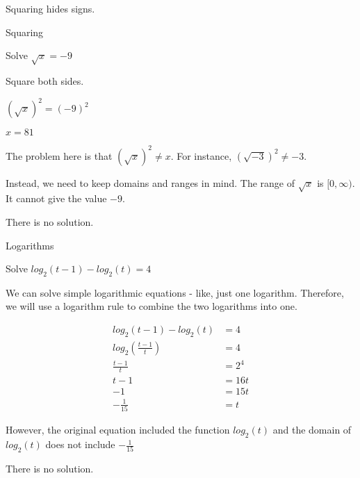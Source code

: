 \documentclass{ximera}
\begin{document}
Squaring hides signs.


\begin{example} Squaring


Solve $\sqrt{x} = -9$

\begin{explanation}

Square both sides.


$(\sqrt{x})^2 = (-9)^2$

$x = 81$



The problem here is that  $(\sqrt{x})^2 \ne x$.  For instance, $(\sqrt{-3})^2 \ne -3$.


Instead, we need to keep domains and ranges in mind.  The range of $\sqrt{x}$ is $[0, \infty)$. It cannot give the value $-9$.


There is no solution.


\end{explanation}

\end{example}









\begin{example} Logarithms


Solve $log_2(t-1) - log_2(t) = 4$


\begin{explanation}


We can solve simple logarithmic equations - like, just one logarithm.  Therefore, we will use a logarithm rule to combine the two logarithms into one.




\begin{align*}
log_2(t-1) - log_2(t) & = 4   \\
log_2 \left( \frac{t-1}{t} \right)  & = 4  \\
\frac{t-1}{t} & = 2^4  \\
 t-1 & = 16t  \\
-1 & = 15t  \\
-\frac{1}{15} & = t
\end{align*}



However, the original equation included the function $log_2(t)$ and the domain of $log_2(t)$ does not include $-\frac{1}{15}$


There is no solution.

\end{explanation}

\end{example}
\end{document}
